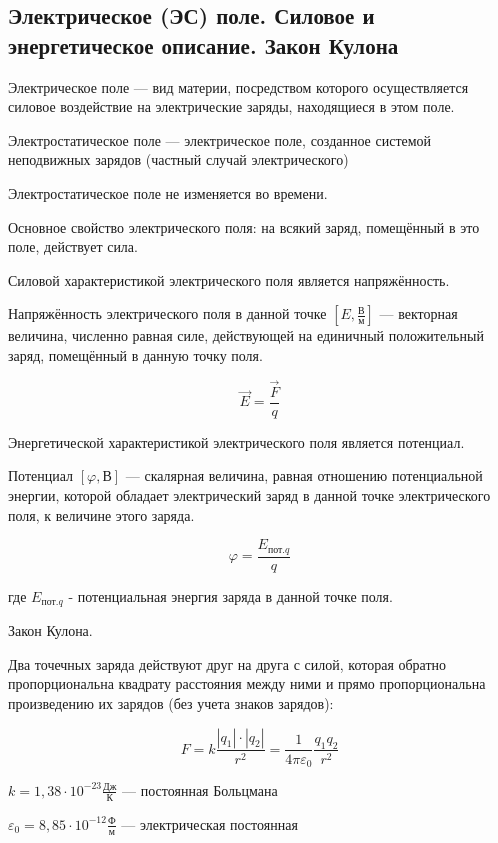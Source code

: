\subsection{Электрическое (ЭС) поле. Силовое и энергетическое описание. Закон Кулона}

\begin{definition}
    Электрическое поле — вид материи, посредством которого 
    осуществляется силовое воздействие на электрические заряды, находящиеся в этом поле.
\end{definition}

\begin{definition}
    Электростатическое поле — электрическое поле, 
    созданное системой неподвижных зарядов (частный случай электрического)
\end{definition}

Электростатическое поле не изменяется во времени.

\begin{definition}
    Основное свойство электрического поля: на всякий заряд, помещённый в это поле, действует сила.
\end{definition}

\begin{definition}
    Силовой характеристикой электрического поля является напряжённость.

    Напряжённость электрического поля в данной точке $[E,\frac{В}{м}]$ — векторная величина, численно равная
    силе, действующей на единичный положительный заряд, помещённый в данную точку поля.
\end{definition}

$$\vec E=\frac{\vec F}{q}$$

\begin{definition}
    Энергетической характеристикой электрического поля является потенциал.

    Потенциал $[\varphi, В]$ — скалярная величина, равная отношению потенциальной энергии, 
    которой обладает электрический заряд в данной точке электрического поля, к величине этого заряда.

    $$\varphi=\frac{E_{пот.q}}{q}$$
    
    где $E_{пот.q}$ - потенциальная энергия заряда в данной точке поля.
\end{definition}

\begin{definition}
    Закон Кулона.

    Два точечных заряда действуют друг на друга с силой, которая обратно пропорциональна квадрату расстояния 
    между ними и прямо пропорциональна произведению их зарядов (без учета знаков зарядов):
\end{definition}

$$F=k\frac{|q_1|\cdot|q_2|}{r^2} = \frac{1}{4\pi\varepsilon_0}\frac{q_1q_2}{r^2}$$

$k = 1,38 \cdot 10^{-23} \frac{Дж}{К}$ — постоянная Больцмана

$\varepsilon_0=8,85\cdot10^{-12} \frac{Ф}{м}$ — электрическая постоянная 